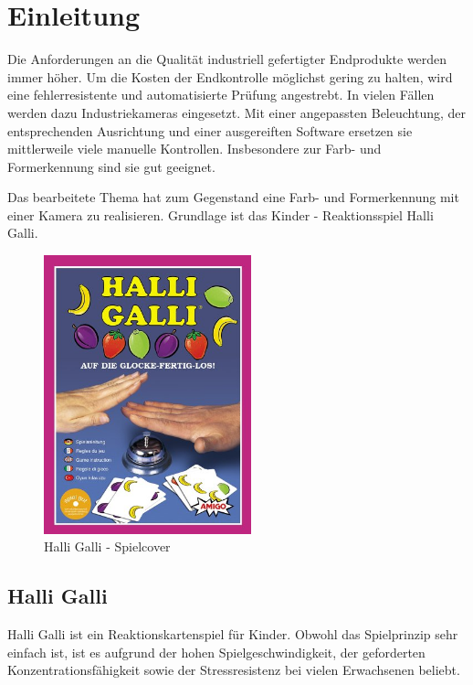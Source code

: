 
\section{Einleitung}
\label{sec:Einleitung}

Die Anforderungen an die Qualität industriell gefertigter Endprodukte werden immer höher. Um die Kosten der Endkontrolle möglichst gering zu halten, wird eine fehlerresistente und automatisierte Prüfung angestrebt. In vielen Fällen werden dazu Industriekameras eingesetzt. Mit einer angepassten Beleuchtung, der entsprechenden Ausrichtung und einer ausgereiften Software ersetzen sie mittlerweile viele manuelle Kontrollen. Insbesondere zur Farb- und Formerkennung sind sie gut geeignet.

Das bearbeitete Thema hat zum Gegenstand eine Farb- und Formerkennung mit einer Kamera zu realisieren. Grundlage ist das Kinder - Reaktionsspiel Halli Galli. 

\begin{figure}[]
    \centering
    \includegraphics[width=6cm]{Abbildungen/cover}
    \caption[Cocer]{Halli Galli - Spielcover}
    \label{fig:Cover}
\end{figure}

\subsection{Halli Galli}

Halli Galli ist ein Reaktionskartenspiel für Kinder. Obwohl das Spielprinzip sehr einfach ist, ist es aufgrund der hohen Spielgeschwindigkeit, der geforderten Konzentrationsfähigkeit sowie der Stressresistenz bei vielen Erwachsenen beliebt. 


